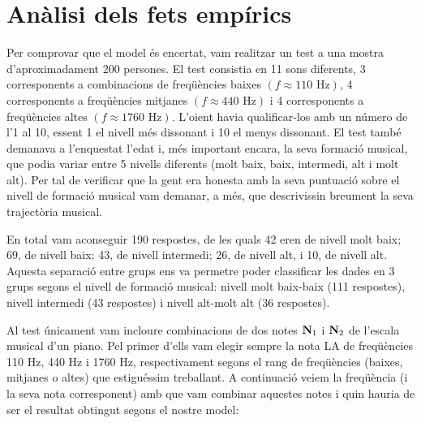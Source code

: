 \documentclass{article}
\theoremstyle{math}
\theoremstyle{TheoremNum}
\newcommand{\0}{\ensuremath{\vb{0}}}
\newcommand{\N}{\ensuremath{\vb{N}}}
\newcommand\Hz{\text{ Hz}}
\begin{document}
\section{Anàlisi dels fets empírics}
Per comprovar que el model és encertat, vam realitzar un test a una mostra d'aproximadament 200 persones. El test consistia en 11 sons diferents, 3 corresponents a combinacions de freqüències baixes $(f \approx 110\Hz)$, 4 corresponents a freqüències mitjanes $(f \approx 440\Hz)$ i 4 corresponents a freqüències altes $(f \approx 1760\Hz)$. L'oient havia qualificar-los amb un número de l'1 al 10, essent 1 el nivell més dissonant i 10 el menys dissonant. El test també demanava a l'enquestat l'edat i, més important encara, la seva formació musical, que podia variar entre 5 nivells diferents (molt baix, baix, intermedi, alt i molt alt). Per tal de verificar que la gent era honesta amb la seva puntuació sobre el nivell de formació musical vam demanar, a més, que descrivissin breument la seva trajectòria musical. \par
En total vam aconseguir 190 respostes, de les quals 42 eren de nivell molt baix; 69, de nivell baix; 43, de nivell intermedi; 26, de nivell alt, i 10, de nivell alt. Aquesta separació entre grups ens va permetre poder classificar les dades en 3 grups segons el nivell de formació musical: nivell molt baix-baix (111 respostes), nivell intermedi (43 respostes) i nivell alt-molt alt (36 respostes). \par
Al test únicament vam incloure combinacions de dos notes $\N_1$ i $\N_2$ de l'escala musical d'un piano. Pel primer d'ells vam elegir sempre la nota LA de freqüències 110 Hz, 440 Hz i 1760 Hz, respectivament segons el rang de freqüències (baixes, mitjanes o altes) que estiguéssim treballant. A continuació veiem la freqüència (i la seva nota corresponent) amb que vam combinar aquestes notes i quin hauria de ser el resultat obtingut segons el nostre model:
\end{document}

